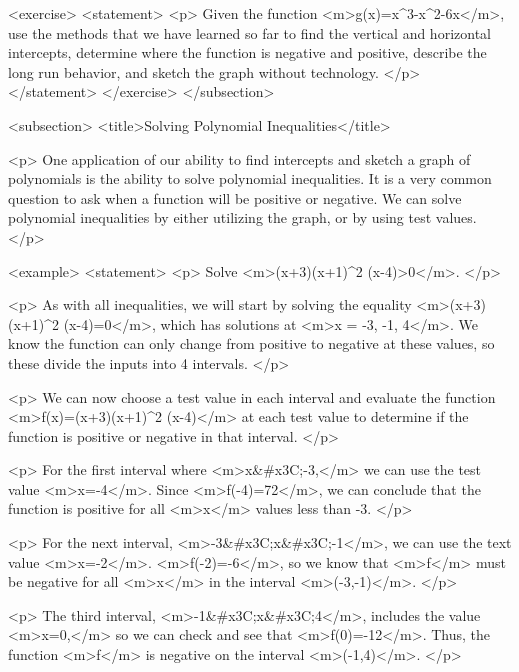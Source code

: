        <exercise>
            <statement>
                <p>
                    Given the function <m>g(x)=x^{3}-x^{2}-6x</m>, use the methods that we have learned so far to find the vertical and horizontal intercepts, determine where the function is negative and positive, describe the long run behavior, and sketch the graph without technology.
                </p>
            </statement>
        </exercise>
    </subsection>


    <subsection>
        <title>Solving Polynomial Inequalities</title>

        <p>
            One application of our ability to find intercepts and sketch a graph of polynomials is the ability to solve polynomial inequalities.
            It is a very common question to ask when a function will be positive or negative.
            We can solve polynomial inequalities by either utilizing the graph, or by using test values.
        </p>

        <example>
            <statement>
                <p>
                    Solve <m>(x+3)(x+1)^{2} (x-4)>0</m>.
                </p>

                <p>
                    As with all inequalities, we will start by solving the equality <m>(x+3)(x+1)^{2} (x-4)=0</m>, which has solutions at <m>x = -3, -1, 4</m>.
                    We know the function can only change from positive to negative at these values, so these divide the inputs into 4 intervals.
                </p>

                <p>
                    We can now choose a test value in each interval and evaluate the function <m>f(x)=(x+3)(x+1)^{2} (x-4)</m> at each test value to determine if the function is positive or negative in that interval.
                </p>

                <p>
                    For the first interval where <m>x&#x3C;-3,</m> we can use the test value <m>x=-4</m>.
                    Since <m>f(-4)=72</m>, we can conclude that the function is positive for all <m>x</m> values less than -3.
                </p>

                <p>
                    For the next interval, <m>-3&#x3C;x&#x3C;-1</m>, we can use the text value <m>x=-2</m>.
                    <m>f(-2)=-6</m>, so we know that <m>f</m> must be negative for all <m>x</m> in the interval <m>(-3,-1)</m>.
                </p>

                <p>
                    The third interval, <m>-1&#x3C;x&#x3C;4</m>, includes the value <m>x=0,</m> so we can check and see that <m>f(0)=-12</m>.
                    Thus, the function <m>f</m> is negative on the interval <m>(-1,4)</m>.
                </p>

